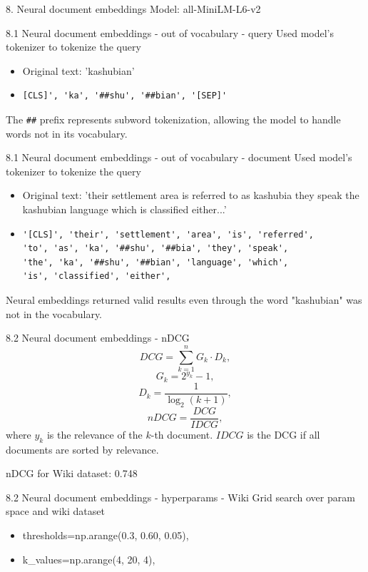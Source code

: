 \documentclass{beamer}
\begin{document}
\begin{frame}{8. Neural document embeddings}
  Model: all-MiniLM-L6-v2
\end{frame}

\begin{frame}[fragile]{8.1 Neural document embeddings - out of vocabulary - query}
  Used model's tokenizer to tokenize the query
  \begin{itemize}
    \item Original text: 'kashubian'
    \item \begin{verbatim}[CLS]', 'ka', '##shu', '##bian', '[SEP]'\end{verbatim}
  \end{itemize}
  The \verb|##| prefix represents subword tokenization, allowing the model to handle words not in its vocabulary.
\end{frame}
\begin{frame}[fragile]{8.1 Neural document embeddings - out of vocabulary - document}
  Used model's tokenizer to tokenize the query
  \begin{itemize}
    \item Original text: 'their settlement area is referred to as kashubia they speak the kashubian language which is classified either...'
    \item \begin{verbatim}
'[CLS]', 'their', 'settlement', 'area', 'is', 'referred',
'to', 'as', 'ka', '##shu', '##bia', 'they', 'speak',
'the', 'ka', '##shu', '##bian', 'language', 'which',
'is', 'classified', 'either',\end{verbatim}
  \end{itemize}
  Neural embeddings returned valid results even through the word "kashubian" was not in the vocabulary.
\end{frame}


\begin{frame}{8.2 Neural document embeddings - nDCG}
  \[ DCG = \sum_{k=1}^{n} G_k \cdot D_k,\]
  \[G_k = 2^{y_k} - 1 , \]
  \[D_k = \frac{1}{\log_2(k+1)},  \]
  \[nDCG = \frac{DCG}{IDCG},\]
  where $y_k$ is the relevance of the $k$-th document.
  $IDCG$ is the DCG if all documents are sorted by relevance.

  nDCG for Wiki dataset: 0.748
\end{frame}


\begin{frame}{8.2 Neural document embeddings - hyperparams - Wiki}
  Grid search over param space and wiki dataset
  \begin{itemize}
    \item thresholds=np.arange(0.3, 0.60, 0.05),
    \item k\_values=np.arange(4, 20, 4),
  \end{itemize}
\end{frame}
\end{document}
